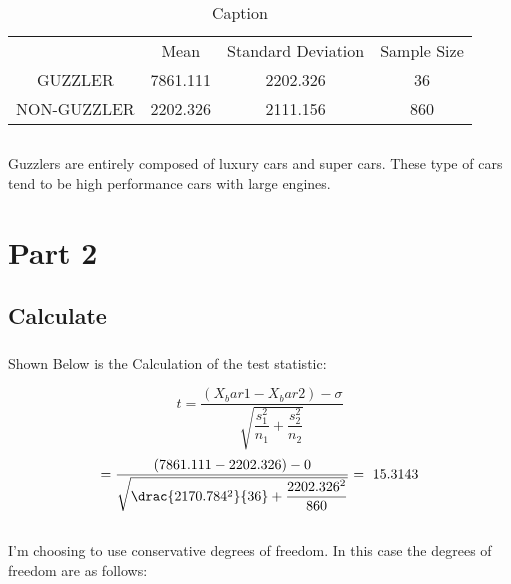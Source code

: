 \documentclass[letterpaper, onecolumn,10pt]{IEEEtran}
\begin{document}
            \subection{}
            \begin{table}[]
                \centering
                \begin{tabular}{c|c|c|c}
                     & Mean & Standard Deviation & Sample Size\\
                     GUZZLER & 7861.111 & 2202.326 & 36\\
                     NON-GUZZLER & 2202.326 & 2111.156 & 860\\
                \end{tabular}
                \caption{Caption}
                \label{tab:my_label}
            \end{table}
            
            \subsection{}
            Guzzlers are entirely composed of luxury cars and super cars. These type of cars tend to be high performance cars with large engines.\\
            
            
        \section{Part 2}
            \subsection{Calculate}
                \subsubsection{}
                    Shown Below is the Calculation of the test statistic:
                    
                    \[
                        t=\dfrac{(X_bar1 - X_bar2)-\sigma}{\sqrt{\dfrac{s^2_1}{n_1} + \dfrac{s^2_2}{n_2}}}
                    \]
                    \[
                        =\dfrac{(7861.111-2202.326) - 0}{\sqrt{\drac{2170.784^2}{36} + \dfrac{2202.326^2}{860}}} =~15.3143
                    \]
                \subsection{}
                    I'm choosing to use conservative degrees of freedom. In this case the degrees of freedom are as follows:
                    
\end{document}
